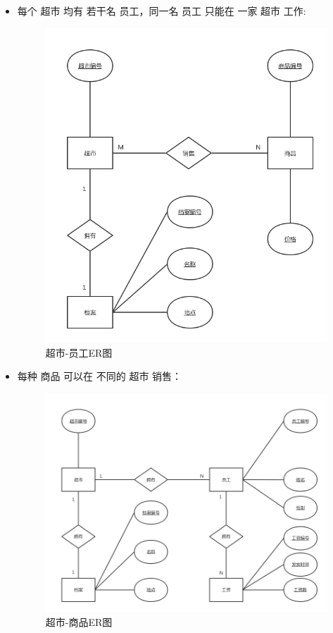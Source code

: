 \begin{itemize}
	\newpage
	\item 每个 超市 均有 若干名 员工，同一名 员工 只能在 一家 超市 工作:
	\begin{figure}[H]
		\centering
		\includegraphics[width=\textwidth]{21}
		\caption{超市-员工ER图}
		\label{fig:2}
	\end{figure}

	\newpage
	\item 每种 商品 可以在 不同的 超市 销售：
	\begin{figure}[H]
		\centering
		\includegraphics[width=\textwidth]{31}
		\caption{超市-商品ER图}
		\label{fig:3}
	\end{figure}
\end{itemize}


